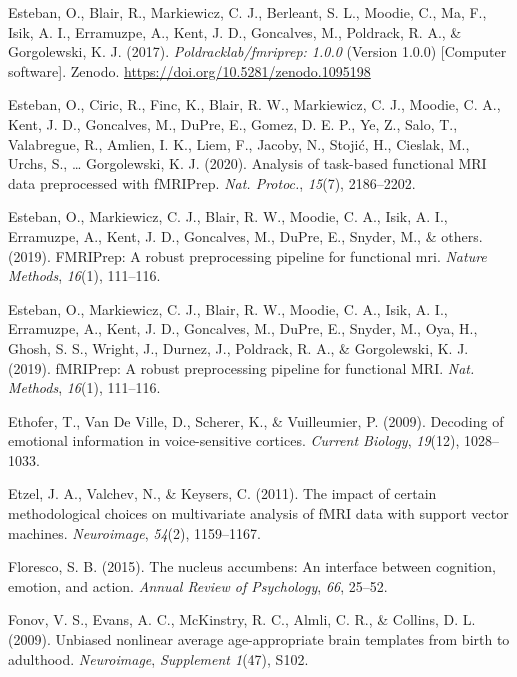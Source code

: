 \documentclass[11pt,american,a4paper,oneside,]{memoir} %
\begin{document}
\leavevmode\hypertarget{ref-esteban_oscar_2017_1095198}{}%
Esteban, O., Blair, R., Markiewicz, C. J., Berleant, S. L., Moodie, C., Ma, F., Isik, A. I., Erramuzpe, A., Kent, J. D., Goncalves, M., Poldrack, R. A., \& Gorgolewski, K. J. (2017). \emph{Poldracklab/fmriprep: 1.0.0} (Version 1.0.0) {[}Computer software{]}. Zenodo. \url{https://doi.org/10.5281/zenodo.1095198}

\leavevmode\hypertarget{ref-Esteban2020-qw}{}%
Esteban, O., Ciric, R., Finc, K., Blair, R. W., Markiewicz, C. J., Moodie, C. A., Kent, J. D., Goncalves, M., DuPre, E., Gomez, D. E. P., Ye, Z., Salo, T., Valabregue, R., Amlien, I. K., Liem, F., Jacoby, N., Stojić, H., Cieslak, M., Urchs, S., \ldots{} Gorgolewski, K. J. (2020). Analysis of task-based functional MRI data preprocessed with fMRIPrep. \emph{Nat. Protoc.}, \emph{15}(7), 2186--2202.

\leavevmode\hypertarget{ref-esteban2019fmriprep}{}%
Esteban, O., Markiewicz, C. J., Blair, R. W., Moodie, C. A., Isik, A. I., Erramuzpe, A., Kent, J. D., Goncalves, M., DuPre, E., Snyder, M., \& others. (2019). FMRIPrep: A robust preprocessing pipeline for functional mri. \emph{Nature Methods}, \emph{16}(1), 111--116.

\leavevmode\hypertarget{ref-Esteban2019-ri}{}%
Esteban, O., Markiewicz, C. J., Blair, R. W., Moodie, C. A., Isik, A. I., Erramuzpe, A., Kent, J. D., Goncalves, M., DuPre, E., Snyder, M., Oya, H., Ghosh, S. S., Wright, J., Durnez, J., Poldrack, R. A., \& Gorgolewski, K. J. (2019). fMRIPrep: A robust preprocessing pipeline for functional MRI. \emph{Nat. Methods}, \emph{16}(1), 111--116.

\leavevmode\hypertarget{ref-ethofer2009decoding}{}%
Ethofer, T., Van De Ville, D., Scherer, K., \& Vuilleumier, P. (2009). Decoding of emotional information in voice-sensitive cortices. \emph{Current Biology}, \emph{19}(12), 1028--1033.

\leavevmode\hypertarget{ref-etzel2011impact}{}%
Etzel, J. A., Valchev, N., \& Keysers, C. (2011). The impact of certain methodological choices on multivariate analysis of fMRI data with support vector machines. \emph{Neuroimage}, \emph{54}(2), 1159--1167.

\leavevmode\hypertarget{ref-floresco2015nucleus}{}%
Floresco, S. B. (2015). The nucleus accumbens: An interface between cognition, emotion, and action. \emph{Annual Review of Psychology}, \emph{66}, 25--52.

\leavevmode\hypertarget{ref-Fonov2009-sr}{}%
Fonov, V. S., Evans, A. C., McKinstry, R. C., Almli, C. R., \& Collins, D. L. (2009). Unbiased nonlinear average age-appropriate brain templates from birth to adulthood. \emph{Neuroimage}, \emph{Supplement 1}(47), S102.
\end{document}
